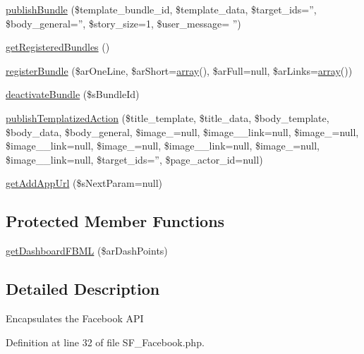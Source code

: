 \begin{DoxyCompactItemize}
\hyperlink{classSF__Facebook_ad78c2cabb0b38ea529ad005ad3df3797}{publishBundle} (\$template\_\-bundle\_\-id, \$template\_\-data, \$target\_\-ids='', \$body\_\-general='', \$story\_\-size=1, \$user\_\-message= '')
\item 
\hyperlink{classSF__Facebook_a8f43b2384c47870d550bd234d4d1c0e5}{getRegisteredBundles} ()
\item 
\hyperlink{classSF__Facebook_a3e8b52e5d4472ecc19b6d0948a386aa4}{registerBundle} (\$arOneLine, \$arShort=\hyperlink{list_8php_aa3205d038c7f8feb5c9f01ac4dfadc88}{array}(), \$arFull=null, \$arLinks=\hyperlink{list_8php_aa3205d038c7f8feb5c9f01ac4dfadc88}{array}())
\item 
\hyperlink{classSF__Facebook_af32bc1b99ba40c07fada3f2e78b29d8d}{deactivateBundle} (\$sBundleId)
\item 
\hyperlink{classSF__Facebook_a2934d82c09cab3e5d4a9a48d8c20e9e0}{publishTemplatizedAction} (\$title\_\-template, \$title\_\-data, \$body\_\-template, \$body\_\-data, \$body\_\-general, \$image\_=null, \$image\_\_\-link=null, \$image\_=null, \$image\_\_\-link=null, \$image\_=null, \$image\_\_\-link=null, \$image\_=null, \$image\_\_\-link=null, \$target\_\-ids='', \$page\_\-actor\_\-id=null)
\item 
\hyperlink{classSF__Facebook_a9ffd051e90f4f71d5930fe4d3123eb85}{getAddAppUrl} (\$sNextParam=null)
\end{DoxyCompactItemize}
\subsection*{Protected Member Functions}
\begin{DoxyCompactItemize}
\item 
\hyperlink{classSF__Facebook_a9ea54a1f1e7a74d731fb7396369a03de}{getDashboardFBML} (\$arDashPoints)
\end{DoxyCompactItemize}


\subsection{Detailed Description}
Encapsulates the Facebook API 

Definition at line 32 of file SF\_\-Facebook.php.



